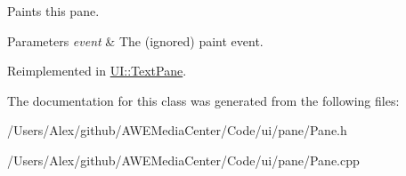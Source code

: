 Paints this pane. 


\begin{DoxyParams}{Parameters}
{\em event} & The (ignored) paint event. \\
\hline
\end{DoxyParams}


Reimplemented in \hyperlink{class_u_i_1_1_text_pane_a9a8be8083a29a1de509f53f2f4642d2b}{U\-I\-::\-Text\-Pane}.



The documentation for this class was generated from the following files\-:\begin{DoxyCompactItemize}
\item 
/\-Users/\-Alex/github/\-A\-W\-E\-Media\-Center/\-Code/ui/pane/Pane.\-h\item 
/\-Users/\-Alex/github/\-A\-W\-E\-Media\-Center/\-Code/ui/pane/Pane.\-cpp\end{DoxyCompactItemize}
